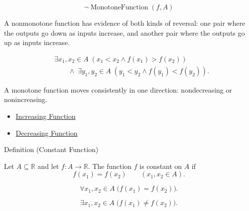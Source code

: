 \begin{remark*}
\[
  \neg\operatorname{MonotoneFunction}(f,A)
\]
\end{remark*}

\begin{remark*}
A nonmonotone function has evidence of both kinds of reversal: one pair
where the outputs go down as inputs increase, and another pair where the
outputs go up as inputs increase.
\end{remark*}

\begin{remark*}
\[
  \begin{aligned}
  &\exists x_1,x_2\in A\;(x_1<x_2\wedge f(x_1)>f(x_2))\\
  &\qquad\wedge\;
  \exists y_1,y_2\in A\;(y_1<y_2\wedge f(y_1)<f(y_2)).
  \end{aligned}
\]
\end{remark*}

\begin{remark*}[Interpretation]
A monotone function moves consistently in one direction: nondecreasing or
nonincreasing.
\end{remark*}

\begin{dependencies}
\begin{itemize}
  \item \hyperref[def:function-increasing]{Increasing Function}
  \item \hyperref[def:function-decreasing]{Decreasing Function}
\end{itemize}
\end{dependencies}

\begin{definitionbox}{Definition (Constant Function)}
\begin{definition}
\label{def:function-constant}
Let $A\subseteq\mathbb{R}$ and let $f:A\to\mathbb{R}$.  The function
$f$ is constant on $A$ if
\[
  f(x_1)=f(x_2)
  \qquad (x_1,x_2\in A).
\]
\end{definition}
\end{definitionbox}

\begin{remark*}
\[
  \forall x_1,x_2\in A\;\bigl(f(x_1)=f(x_2)\bigr).
\]
\end{remark*}

\begin{remark*}
\[
  \exists x_1,x_2\in A\;\bigl(f(x_1)\neq f(x_2)\bigr).
\]
\end{remark*}

